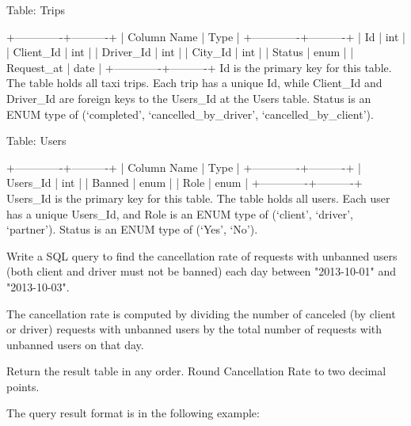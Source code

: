 Table: Trips

\begin{Code}
+-------------+----------+
| Column Name | Type     |
+-------------+----------+
| Id          | int      |
| Client_Id   | int      |
| Driver_Id   | int      |
| City_Id     | int      |
| Status      | enum     |
| Request_at  | date     |     
+-------------+----------+
Id is the primary key for this table.
The table holds all taxi trips. Each trip has a unique Id, while Client_Id and Driver_Id are foreign keys to the Users_Id at the Users table.
Status is an ENUM type of (‘completed’, ‘cancelled_by_driver’, ‘cancelled_by_client’).
\end{Code}

Table: Users

\begin{Code}
+-------------+----------+
| Column Name | Type     |
+-------------+----------+
| Users_Id    | int      |
| Banned      | enum     |
| Role        | enum     |
+-------------+----------+
Users_Id is the primary key for this table.
The table holds all users. Each user has a unique Users_Id, and Role is an ENUM type of (‘client’, ‘driver’, ‘partner’).
Status is an ENUM type of (‘Yes’, ‘No’).
\end{Code}

Write a SQL query to find the cancellation rate of requests with unbanned users (both client and driver must not be banned) each day between "2013-10-01" and "2013-10-03".

The cancellation rate is computed by dividing the number of canceled (by client or driver) requests with unbanned users by the total number of requests with unbanned users on that day.

Return the result table in any order. Round Cancellation Rate to two decimal points.

The query result format is in the following example:

